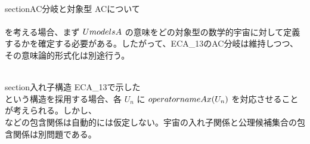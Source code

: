 \documentclass[11pt,a4paper]{article}
\begin{document}
\\section{AC分岐と対象型}
ACについて
\\[
\\mathfrak U_{\\mathrm{AC}}=\\{U\\in\\mathfrak U_{\\mathrm{ECA}}\\mid U\\models\\mathrm{AC}\\},
\\]
\\[
\\mathfrak U_{\\neg\\mathrm{AC}}=\\{U\\in\\mathfrak U_{\\mathrm{ECA}}\\mid U\\models\\neg\\mathrm{AC}\\}
\\]
を考える場合、まず $U\\models A$ の意味をどの対象型の数学的宇宙に対して定義するかを確定する必要がある。したがって、ECA_13のAC分岐は維持しつつ、その意味論的形式化は別途行う。

\\section{入れ子構造}
ECA_13で示した
\\[
U_{n+1}\\in\\mathfrak U_{\\mathrm{ECA}}(U_n)
\\]
という構造を採用する場合、各 $U_n$ に $\\operatorname{Ax}(U_n)$ を対応させることが考えられる。しかし、
\\[
\\operatorname{Ax}(U_{n+1})\\subseteq\\operatorname{Ax}(U_n)
\\]
などの包含関係は自動的には仮定しない。宇宙の入れ子関係と公理候補集合の包含関係は別問題である。
\end{document}
